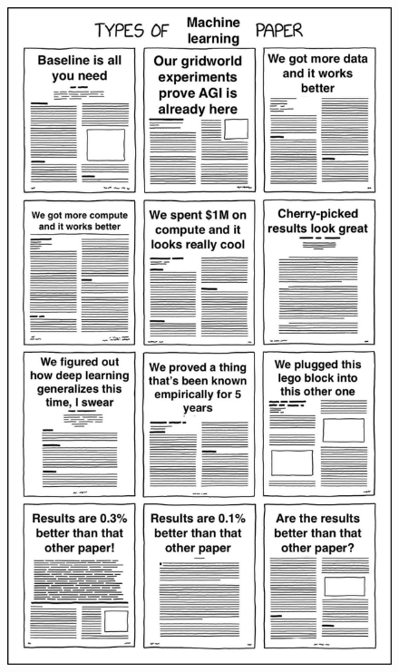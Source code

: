 \documentclass{beamer}
\begin{document}
\begin{frame}
\begin{columns}
\begin{figure}[H]
                \includegraphics[width=.7\linewidth]{types-of-m}
        \end{figure}\noindent
    \end{columns}
\end{frame}
\end{document}
